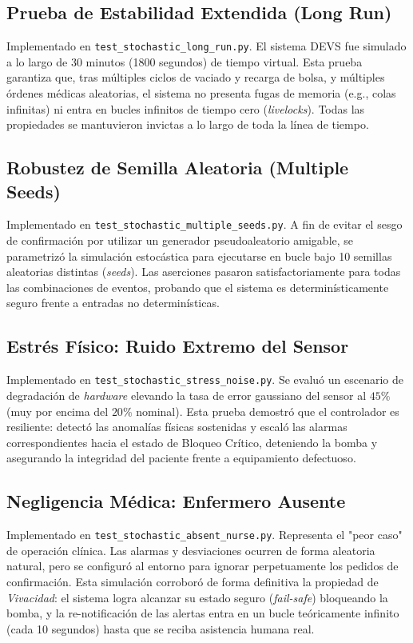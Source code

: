 \subsection{Prueba de Estabilidad Extendida (Long Run)}
Implementado en \texttt{test\_stochastic\_long\_run.py}. El sistema DEVS fue simulado a lo largo de 30 minutos (1800 segundos) de tiempo virtual. Esta prueba garantiza que, tras múltiples ciclos de vaciado y recarga de bolsa, y múltiples órdenes médicas aleatorias, el sistema no presenta fugas de memoria (e.g., colas infinitas) ni entra en bucles infinitos de tiempo cero (\textit{livelocks}). Todas las propiedades se mantuvieron invictas a lo largo de toda la línea de tiempo.

\subsection{Robustez de Semilla Aleatoria (Multiple Seeds)}
Implementado en \texttt{test\_stochastic\_multiple\_seeds.py}. A fin de evitar el sesgo de confirmación por utilizar un generador pseudoaleatorio amigable, se parametrizó la simulación estocástica para ejecutarse en bucle bajo 10 semillas aleatorias distintas (\textit{seeds}). Las aserciones pasaron satisfactoriamente para todas las combinaciones de eventos, probando que el sistema es determinísticamente seguro frente a entradas no determinísticas.

\subsection{Estrés Físico: Ruido Extremo del Sensor}
Implementado en \texttt{test\_stochastic\_stress\_noise.py}. Se evaluó un escenario de degradación de \textit{hardware} elevando la tasa de error gaussiano del sensor al $45\%$ (muy por encima del $20\%$ nominal). Esta prueba demostró que el controlador es resiliente: detectó las anomalías físicas sostenidas y escaló las alarmas correspondientes hacia el estado de Bloqueo Crítico, deteniendo la bomba y asegurando la integridad del paciente frente a equipamiento defectuoso.

\subsection{Negligencia Médica: Enfermero Ausente}
Implementado en \texttt{test\_stochastic\_absent\_nurse.py}. Representa el "peor caso" de operación clínica. Las alarmas y desviaciones ocurren de forma aleatoria natural, pero se configuró al entorno para ignorar perpetuamente los pedidos de confirmación. Esta simulación corroboró de forma definitiva la propiedad de \textit{Vivacidad}: el sistema logra alcanzar su estado seguro (\textit{fail-safe}) bloqueando la bomba, y la re-notificación de las alertas entra en un bucle teóricamente infinito (cada 10 segundos) hasta que se reciba asistencia humana real.

